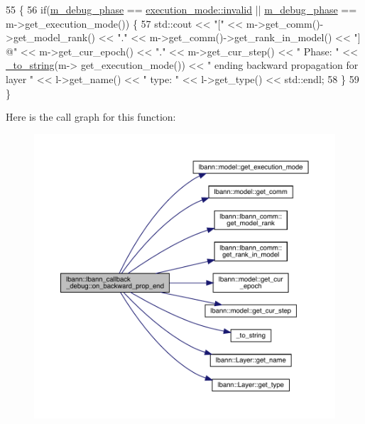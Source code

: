 \begin{DoxyCode}
55                                                                        \{
56   \textcolor{keywordflow}{if}(\hyperlink{classlbann_1_1lbann__callback__debug_acc66ab699534e42aa958148f1fb3fd6f}{m\_debug\_phase} == \hyperlink{base_8hpp_a2781a159088df64ed7d47cc91c4dc0a8afedb2d84cafe20862cb4399751a8a7e3}{execution\_mode::invalid} || 
      \hyperlink{classlbann_1_1lbann__callback__debug_acc66ab699534e42aa958148f1fb3fd6f}{m\_debug\_phase} == m->get\_execution\_mode()) \{
57     std::cout << \textcolor{stringliteral}{"["} << m->get\_comm()->get\_model\_rank() << \textcolor{stringliteral}{"."} << m->get\_comm()->get\_rank\_in\_model() << \textcolor{stringliteral}{"]
       @"} << m->get\_cur\_epoch() << \textcolor{stringliteral}{"."} << m->get\_cur\_step() << \textcolor{stringliteral}{" Phase: "} << \hyperlink{base_8hpp_adeeaddd10bd31df0cae7cb0fcae45d5c}{\_to\_string}(m->
      get\_execution\_mode()) << \textcolor{stringliteral}{"   ending backward propagation for layer "} << l->get\_name() << \textcolor{stringliteral}{" type: "} << l->get\_type() << 
      std::endl;
58   \}
59 \}
\end{DoxyCode}
Here is the call graph for this function\+:\nopagebreak
\begin{figure}[H]
\begin{center}
\leavevmode
\includegraphics[width=350pt]{classlbann_1_1lbann__callback__debug_a19a8ec63f55fc86024c9ab8fe0836500_cgraph}
\end{center}
\end{figure}
